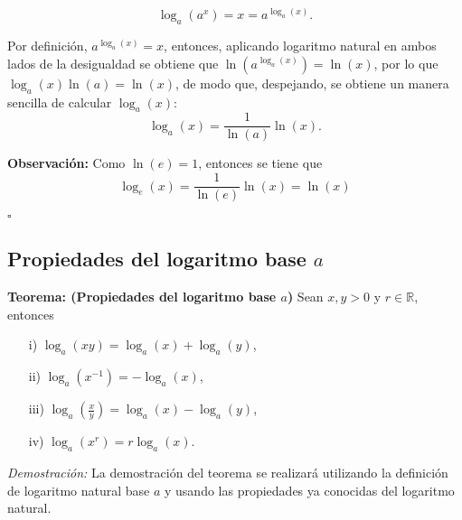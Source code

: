 \documentclass[pts12]{article}
\numberwithin{equation}{section}
\newcommand{\Col}{\color{ProcessBlue}}
\begin{document}
$$ \log_a(a^x)=x=a^{\log_a(x)}. $$

Por definición, $a^{\log_a(x)}=x$, entonces, aplicando logaritmo natural en ambos lados de la desigualdad se obtiene que $\ln(a^{\log_a(x)})=\ln(x)$, por lo que $\log_a(x)\ln(a)=\ln(x)$, de modo que, despejando, se obtiene un manera sencilla de calcular $\log_a(x)$: 
$$\log_a(x)=\frac{1}{\ln(a)}\ln(x).$$ 

\textbf{Observación:} Como $\ln(e)=1$, entonces se tiene que
$$ \log_e(x)=\frac{1}{\ln(e)}\ln(x)=\ln(x) $$

\begin{flushright}
$\square$
\end{flushright}

\subsection{\Col Propiedades del logaritmo base $a$}

\textbf{Teorema: (Propiedades del logaritmo base $a$)} Sean $x,y>0$ y $r\in\mathbb{R}$, entonces 

\setlength{\columnsep}{-1.1in}
\begin{multicols}{2}
    \begin{itemize}
        \item[i)] $\log_a(xy)=\log_a(x)+\log_a(y)$,
        \item[ii)] $\log_a(x^{-1})=-\log_a(x)$,
        \item[iii)] $\log_a(\frac{x}{y})=\log_a(x)-\log_a(y)$,
        \item[iv)] $\log_a(x^r)=r\log_a(x)$.
    \end{itemize}
\end{multicols}

\textit{Demostración:} La demostración del teorema se realizará utilizando la definición de logaritmo natural base $a$ y usando las propiedades ya conocidas del logaritmo natural. 
\end{document}
